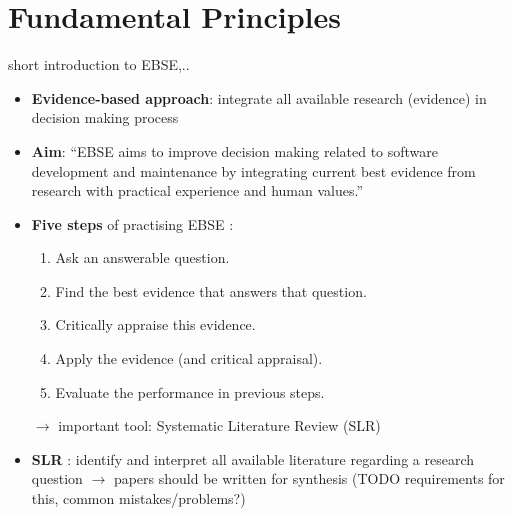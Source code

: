 \newcommand{\q}[1]{``#1''}
\section{Fundamental Principles}

short introduction to EBSE,..

\begin{itemize}
	\item \textbf{Evidence-based approach}: integrate all available research (evidence) in decision making process
	\item \textbf{Aim}: \q{EBSE aims to improve decision making related to software development and maintenance by integrating current best evidence from research with practical experience and human values.} \cite{EBSEpract}
	\item \textbf{Five steps} of practising EBSE \cite{EBSE}:
		\begin{enumerate}
			\item Ask an answerable question.
			\item Find the best evidence that answers that question.
			\item Critically appraise this evidence.
			\item Apply the evidence (and critical appraisal).
			\item Evaluate the performance in previous steps.
		\end{enumerate}
		$\rightarrow$ important tool: Systematic Literature Review (SLR)
	\item \textbf{SLR} \cite{keele2007}: identify and interpret all available literature regarding a research question
		$\rightarrow$ papers should be written for synthesis (TODO requirements for this, common mistakes/problems?)
\end{itemize}